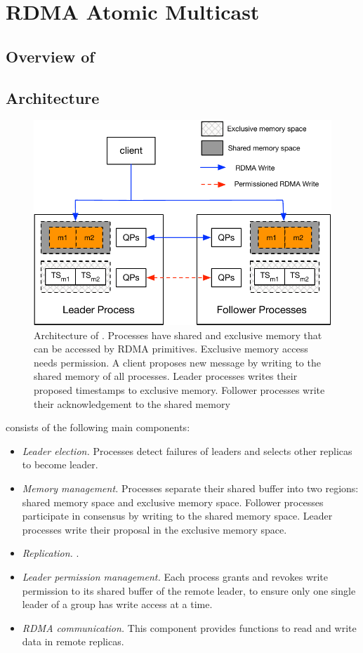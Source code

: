 \section{RDMA Atomic Multicast}
\label{sec:rdma-atomic-multicast}
\subsection{Overview of \libname}

\subsection{Architecture}


\begin{figure}[ht!]
  \centering
  \includegraphics[width=1\linewidth]{figures/architecture}
  \caption{Architecture of \libname. Processes have shared and exclusive memory that can be accessed by RDMA primitives. Exclusive memory access needs permission. A client proposes new message by writing to the shared memory of all processes. Leader processes writes their proposed timestamps to exclusive memory. Follower processes write their acknowledgement to the shared memory}
  \label{fig:normal_operation_time}
\end{figure}


\libname consists of the following main components:
\begin{itemize}
  \item \emph{Leader election.} Processes detect failures of leaders and
  selects other replicas to become leader.
  \item \emph{Memory management.} Processes separate their shared buffer into two
  regions: shared memory space and exclusive memory space. Follower processes
  participate in consensus by writing to the shared memory space. Leader
  processes write their proposal in the exclusive memory space.
  \item \emph{Replication.} .
  \item \emph{Leader permission management.} Each process grants and revokes
  write permission to its shared buffer of the remote leader, to ensure only one
  single leader of a group has write access at a time.
  \item \emph{RDMA communication.} This component provides functions to read and
  write data in remote replicas.
\end{itemize}


